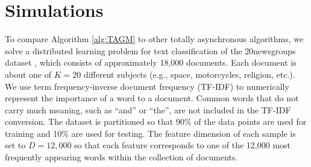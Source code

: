 \documentclass[9pt,shortpaper,twoside,web]{ieeecolor}
\newcommand{\blue}[1]{{\textcolor{blue}{#1}}}
\begin{document}
\section{Simulations} \label{sec:simulations}

    To compare Algorithm \ref{alg:TAGM} to other totally asynchronous algorithms, we solve a distributed learning problem for text classification of the 20newsgroups dataset \cite{newsgroups}, which
    consists of approximately 18,000 documents. Each
    document is about one of $K=20$ different subjects 
    (e.g., space, motorcycles, religion, etc.).
    We use term frequency-inverse document frequency (TF-IDF) to numerically represent the importance of a word to a document.
    Common words that do not carry much meaning, such as ``and'' or ``the'', are not included in the TF-IDF conversion. 
    The dataset is partitioned so that 90\% of the data points are used for training and 10\% are used for testing. 
    The feature dimension of each sample is set to $D=12,000$ so that each feature corresponds to one of the 12,000 most frequently appearing words within the collection of documents.
\end{document}
